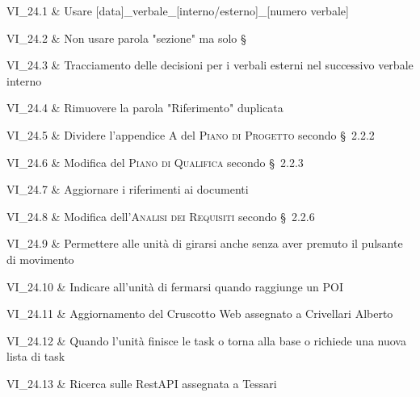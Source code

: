 VI\_24.1 & Usare [data]\_verbale\_[interno/esterno]\_[numero verbale]

\tabularnewline
VI\_24.2 & Non usare parola "sezione" ma solo \S\ 

\tabularnewline
VI\_24.3 & Tracciamento delle decisioni per i verbali esterni nel successivo verbale interno

\tabularnewline
VI\_24.4 & Rimuovere la parola "Riferimento" duplicata

\tabularnewline
VI\_24.5 & Dividere l'appendice A del \textsc{Piano di Progetto} secondo \S\ 2.2.2

\tabularnewline
VI\_24.6 & Modifica del \textsc{Piano di Qualifica} secondo \S\ 2.2.3

\tabularnewline
VI\_24.7 & Aggiornare i riferimenti ai documenti

\tabularnewline
VI\_24.8 & Modifica dell'\textsc{Analisi dei Requisiti} secondo \S\ 2.2.6

\tabularnewline
VI\_24.9 & Permettere alle unità di girarsi anche senza aver premuto il pulsante di movimento

\tabularnewline
VI\_24.10 & Indicare all'unità di fermarsi quando raggiunge un POI

\tabularnewline
VI\_24.11 & Aggiornamento del Cruscotto Web assegnato a Crivellari Alberto

\tabularnewline
VI\_24.12 & Quando l'unità finisce le task o torna alla base o richiede una nuova lista di task

\tabularnewline
VI\_24.13 & Ricerca sulle RestAPI assegnata a Tessari